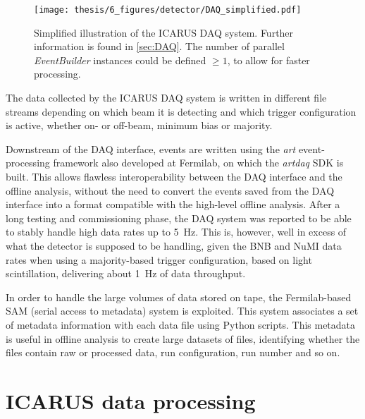 \begin{figure}
    \centering
    \texttt{[image: thesis/6\_figures/detector/DAQ\_simplified.pdf]}
    \caption[ICARUS DAQ illustration]{Simplified illustration of the ICARUS DAQ system. Further information is found in \autoref{sec:DAQ}. The number of parallel \emph{EventBuilder} instances could be defined $\geq1$, to allow for faster processing.}
    \label{fig:DAQ}
\end{figure}

The data collected by the ICARUS DAQ system is written in different file streams depending on which beam it is detecting and which trigger configuration is active, whether on- or off-beam, minimum bias or majority. 

Downstream of the DAQ interface, events are written using the \emph{art} event-processing framework \cite{greenArtFramework2012} also developed at Fermilab, on which the \emph{artdaq} SDK is built. This allows flawless interoperability between the DAQ interface and the offline analysis, without the need to convert the events saved from the DAQ interface into a format compatible with the high-level offline analysis. After a long testing and commissioning phase, the DAQ system was reported to be able to stably handle high data rates up to \SI{5}{\hertz}. This is, however, well in excess of what the detector is supposed to be handling, given the BNB and NuMI data rates when using a majority-based trigger configuration, based on light scintillation, delivering about \SI{1}{\hertz} of data throughput.  

In order to handle the large volumes of data stored on tape, the Fermilab-based SAM (serial access to metadata) system is exploited. This system associates a set of metadata information with each data file using Python scripts. This metadata is useful in offline analysis to create large datasets of files, identifying whether the files contain raw or processed data, run configuration, run number and so on.

\section{ICARUS data processing}

